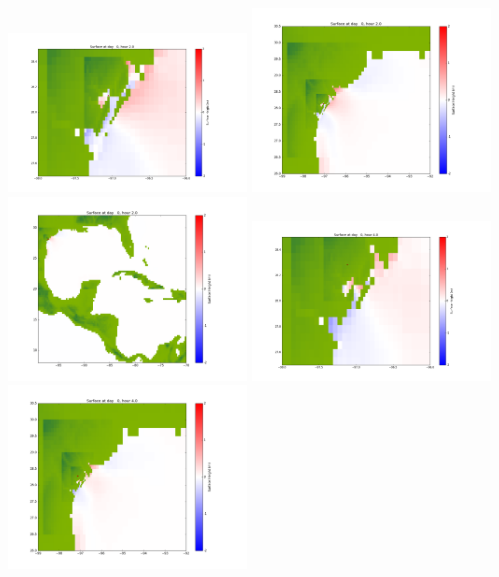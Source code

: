 \documentclass[11pt]{article}
\begin{document}
\vskip 10pt 
\includegraphics[width=0.475\textwidth]{frame0025fig1001.png}
\includegraphics[width=0.475\textwidth]{frame0025fig1002.png}
\vskip 10pt 
\includegraphics[width=0.475\textwidth]{frame0025fig1003.png}
\vskip 10pt 
\includegraphics[width=0.475\textwidth]{frame0026fig1001.png}
\includegraphics[width=0.475\textwidth]{frame0026fig1002.png}
\end{document}
